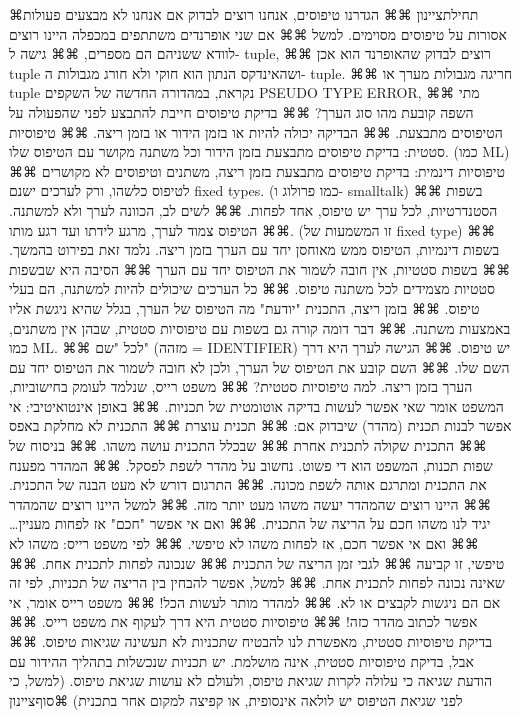       ⌘תחילת{ציינון}
      ⌘⌘ הגדרנו טיפוסים, אנחנו רוצים לבדוק אם אנחנו לא מבצעים פעולות אסורות על טיפוסים מסוימים. למשל
      ⌘⌘ אם שני אופרנדים משתתפים במכפלה היינו רוצים לוודא ששניהם הם מספרים,
      ⌘⌘ גישה ל- tuple,
      ⌘⌘ רוצים לבדוק שהאופרנד הוא אכן tuple ושהאינדקס הנתון הוא חוקי ולא חורג מגבולות ה- tuple.
      ⌘⌘ חריגה מגבולות מערך או tuple נקראת, במהדורה החדשה של השקפים PSEUDO TYPE ERROR,
      ⌘⌘ מתי השפה קובעת מהו סוג הערך?
      ⌘⌘ בדיקת טיפוסים חייבת להתבצע לפני שהפעולה על הטיפוסים מתבצעת.
      ⌘⌘ הבדיקה יכולה להיות או בזמן הידור או בזמן ריצה.
      ⌘⌘ טיפוסיות סטטית: בדיקת טיפוסים מתבצעת בזמן הידור וכל משתנה מקושר עם הטיפוס שלו. (כמו ML)
      ⌘⌘ טיפוסיות דינמית: בדיקת טיפוסים מתבצעת בזמן ריצה, משתנים וטיפוסים לא מקושרים לטיפוס כלשהו, ורק לערכים ישנם fixed types. (כמו פרולוג ו- smalltalk)
      ⌘⌘ בשפות הסטנדרטיות, לכל ערך יש טיפוס, אחד לפחות.
      ⌘⌘ לשים לב, הכוונה לערך ולא למשתנה.
      ⌘⌘ הטיפוס צמוד לערך, מרגע לידתו ועד רגע מותו. (זו המשמעות של fixed type)
      ⌘⌘ בשפות דינמיות, הטיפוס ממש מאוחסן יחד עם הערך בזמן ריצה. נלמד זאת בפירוט בהמשך.
      ⌘⌘ בשפות סטטיות, אין חובה לשמור את הטיפוס יחד עם הערך
      ⌘⌘ הסיבה היא שבשפות סטטיות מצמידים לכל משתנה טיפוס.
      ⌘⌘ כל הערכים שיכולים להיות למשתנה, הם בעלי טיפוס.
      ⌘⌘ בזמן ריצה, התכנית "יודעת" מה הטיפוס של הערך, בגלל שהיא ניגשת אליו באמצעות משתנה.
      ⌘⌘ דבר דומה קורה גם בשפות עם טיפוסיות סטטית, שבהן אין משתנים, כמו ML.
      ⌘⌘ לכל "שם" (מזהה = IDENTIFIER) יש טיפוס.
      ⌘⌘ הגישה לערך היא דרך השם שלו.
      ⌘⌘ השם קובע את הטיפוס של הערך, ולכן לא חובה לשמור את הטיפוס יחד עם הערך בזמן ריצה.
      למה טיפוסיות סטטית?
      ⌘⌘ משפט רייס, שנלמד לעומק בחישוביות, המשפט אומר שאי אפשר לעשות בדיקה אוטומטית של תכניות.
      ⌘⌘ באופן אינטואיטיבי: אי אפשר לבנות תכנית (מהדר) שיבדוק אם:
      ⌘⌘ תכנית עוצרת
      ⌘⌘ התכנית לא מחלקת באפס
      ⌘⌘ התכנית שקולה לתכנית אחרת
      ⌘⌘ שבכלל התכנית עושה משהו.
      ⌘⌘ בניסוח של שפות תכנות, המשפט הוא די פשוט. נחשוב על מהדר לשפת לפסקל.
      ⌘⌘ המהדר מפענח את התכנית ומתרגם אותה לשפת מכונה.
      ⌘⌘ התרגום דורש לא מעט הבנה של התכנית.
      ⌘⌘ היינו רוצים שהמהדר יעשה משהו מעט יותר מזה.
      ⌘⌘ למשל היינו רוצים שהמהדר יגיד לנו משהו חכם על הריצה של התכנית.
      ⌘⌘ ואם אי אפשר "חכם" אז לפחות מעניין…
      ⌘⌘ ואם אי אפשר חכם, אז לפחות משהו לא טיפשי.
      ⌘⌘ לפי משפט רייס: משהו לא טיפשי, זו קביעה
      ⌘⌘ לגבי זמן הריצה של התכנית
      ⌘⌘ שנכונה לפחות לתכנית אחת.
      ⌘⌘ שאינה נכונה לפחות לתכנית אחת.
      ⌘⌘ למשל, אפשר להבחין בין הריצה של תכניות, לפי זה אם הם ניגשות לקבצים או לא.
      ⌘⌘ למהדר מותר לעשות הכל!
      ⌘⌘ משפט רייס אומר, אי אפשר לכתוב מהדר כזה!
      ⌘⌘ טיפוסיות סטטית היא דרך לעקוף את משפט רייס.
      ⌘⌘ בדיקת טיפוסיות סטטית, מאפשרת לנו להבטיח שתכניות לא תעשינה שגיאות טיפוס.
      ⌘⌘ אבל, בדיקת טיפוסיות סטטית, אינה מושלמת. יש תכניות שנכשלות בתהליך ההידור עם הודעת שגיאה כי עלולה לקרות שגיאת טיפוס, ולעולם לא עושות שגיאת טיפוס. (למשל, כי לפני שגיאת הטיפוס יש לולאה אינסופית, או קפיצה למקום אחר בתכנית)
    ⌘סוף{ציינון}

